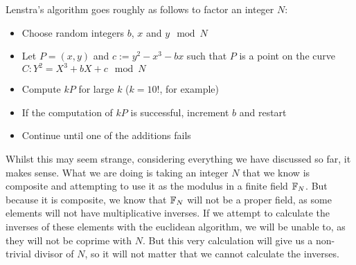\begin{definition}
	Lenstra's algorithm goes roughly as follows to factor an integer $N$:
	\begin{itemize}
		\item Choose random integers $b$, $x$ and $y \mod N$
		\item Let $P = (x,y)$ and $c:=y^2-x^3-bx$ such that $P$ is a point on the curve $C: Y^2 = X^3 +bX + c \mod N$
		\item Compute $kP$ for large $k$ ($k=10!$, for example)
		\item If the computation of $kP$ is successful, increment $b$ and restart
		\item Continue until one of the additions fails
	\end{itemize}
\end{definition}
Whilst this may seem strange, considering everything we have discussed so far, it makes sense. What we are doing is taking an integer $N$ that we know is composite and attempting to use it as the modulus in a finite field $\fp[N]$. But because it is composite, we know that $\fp[N]$ will not be a proper field, as some elements will not have multiplicative inverses. If we attempt to calculate the inverses of these elements with the euclidean algorithm, we will be unable to, as they will not be coprime with $N$. But this very calculation will give us a non-trivial divisor of $N$, so it will not matter that we cannot calculate the inverses.

